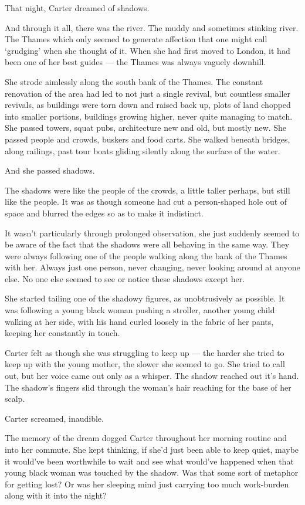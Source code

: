 That night, Carter dreamed of shadows.

And through it all, there was the river. The muddy and sometimes stinking river. The Thames which only seemed to generate affection that one might call `grudging' when she thought of it. When she had first moved to London, it had been one of her best guides --- the Thames was always vaguely downhill.

She strode aimlessly along the south bank of the Thames. The constant renovation of the area had led to not just a single revival, but countless smaller revivals, as buildings were torn down and raised back up, plots of land chopped into smaller portions, buildings growing higher, never quite managing to match. She passed towers, squat pubs, architecture new and old, but mostly new. She passed people and crowds, buskers and food carts. She walked beneath bridges, along railings, past tour boats gliding silently along the surface of the water.

And she passed shadows.

The shadows were like the people of the crowds, a little taller perhaps, but still like the people. It was as though someone had cut a person-shaped hole out of space and blurred the edges so as to make it indistinct.

It wasn't particularly through prolonged observation, she just suddenly seemed to be aware of the fact that the shadows were all behaving in the same way. They were always following one of the people walking along the bank of the Thames with her. Always just one person, never changing, never looking around at anyone else. No one else seemed to see or notice these shadows except her.

She started tailing one of the shadowy figures, as unobtrusively as possible. It was following a young black woman pushing a stroller, another young child walking at her side, with his hand curled loosely in the fabric of her pants, keeping her constantly in touch.

Carter felt as though she was struggling to keep up --- the harder she tried to keep up with the young mother, the slower she seemed to go. She tried to call out, but her voice came out only as a whisper. The shadow reached out it's hand. The shadow's fingers slid through the woman's hair reaching for the base of her scalp.

Carter screamed, inaudible.

The memory of the dream dogged Carter throughout her morning routine and into her commute. She kept thinking, if she'd just been able to keep quiet, maybe it would've been worthwhile to wait and see what would've happened when that young black woman was touched by the shadow. Was that some sort of metaphor for getting lost? Or was her sleeping mind just carrying too much work-burden along with it into the night?

